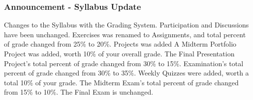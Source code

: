 \documentclass{beamer}
\begin{document}
\begin{frame}
	\frametitle{Announcement - Syllabus Update}
	\begin{outline}
		\1 Changes to the Syllabus with the Grading System.
		\1 Participation and Discussions have been unchanged.
		\1 Exercises was renamed to Assignments, and total percent of grade changed from 25\% to 20\%.
		\1 Projects was added
		\2 A Midterm Portfolio Project was added, worth 10\% of your overall grade.
		\2 The Final Presentation Project's total percent of grade changed from 30\% to 15\%.
		\1 Examination's total percent of grade changed from 30\% to 35\%.
		\2 Weekly Quizzes were added, worth a total 10\% of your grade.
		\2 The Midterm Exam's total percent of grade changed from 15\% to 10\%.
		\2 The Final Exam is unchanged.
	\end{outline}
\end{frame}
\end{document}
